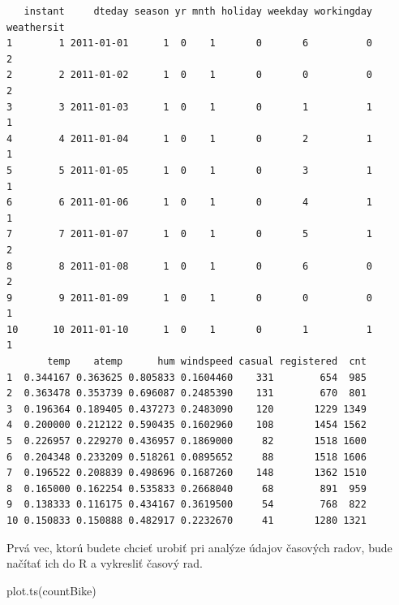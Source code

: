 \documentclass[
  letterpaper,
  DIV=11,
  numbers=noendperiod]{scrreprt}
\newenvironment{Shaded}{\begin{snugshade}}{\end{snugshade}}
\newcommand{\FunctionTok}[1]{\textcolor[rgb]{0.28,0.35,0.67}{#1}}
\newcommand{\NormalTok}[1]{\textcolor[rgb]{0.00,0.23,0.31}{#1}}
\newcommand{\OtherTok}[1]{\textcolor[rgb]{0.00,0.23,0.31}{#1}}
\newcommand{\SpecialCharTok}[1]{\textcolor[rgb]{0.37,0.37,0.37}{#1}}
\newcommand{\StringTok}[1]{\textcolor[rgb]{0.13,0.47,0.30}{#1}}
\begin{document}
\begin{verbatim}
   instant     dteday season yr mnth holiday weekday workingday weathersit
1        1 2011-01-01      1  0    1       0       6          0          2
2        2 2011-01-02      1  0    1       0       0          0          2
3        3 2011-01-03      1  0    1       0       1          1          1
4        4 2011-01-04      1  0    1       0       2          1          1
5        5 2011-01-05      1  0    1       0       3          1          1
6        6 2011-01-06      1  0    1       0       4          1          1
7        7 2011-01-07      1  0    1       0       5          1          2
8        8 2011-01-08      1  0    1       0       6          0          2
9        9 2011-01-09      1  0    1       0       0          0          1
10      10 2011-01-10      1  0    1       0       1          1          1
       temp    atemp      hum windspeed casual registered  cnt
1  0.344167 0.363625 0.805833 0.1604460    331        654  985
2  0.363478 0.353739 0.696087 0.2485390    131        670  801
3  0.196364 0.189405 0.437273 0.2483090    120       1229 1349
4  0.200000 0.212122 0.590435 0.1602960    108       1454 1562
5  0.226957 0.229270 0.436957 0.1869000     82       1518 1600
6  0.204348 0.233209 0.518261 0.0895652     88       1518 1606
7  0.196522 0.208839 0.498696 0.1687260    148       1362 1510
8  0.165000 0.162254 0.535833 0.2668040     68        891  959
9  0.138333 0.116175 0.434167 0.3619500     54        768  822
10 0.150833 0.150888 0.482917 0.2232670     41       1280 1321
\end{verbatim}

\begin{Shaded}
\end{Shaded}

Prvá vec, ktorú budete chcieť urobiť pri analýze údajov časových radov,
bude načítať ich do R a vykresliť časový rad.

\begin{Shaded}
\begin{Highlighting}[]
\FunctionTok{plot.ts}\NormalTok{(countBike)}
\end{Highlighting}
\end{Shaded}
\end{document}
